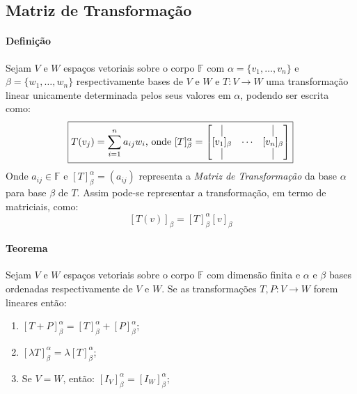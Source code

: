 \documentclass{article}
\begin{document}
        \subsection{Matriz de Transformação}
            \paragraph{Definição}Sejam $V$ e $W$ espaços vetoriais sobre o corpo $\mathbb{F}$ com $\alpha = \{v_{1},\dots,v_{n}\}$ e $\beta = \{w_{1},\dots,w_{n}\}$ respectivamente bases de $V$ e $W$ e $T: V \rightarrow W$ uma transformação linear unicamente determinada pelos seus valores em $\alpha$, podendo ser escrita como:
                \[\boxed{T(v_{j}) = \sum\limits_{i=1}^{n} a_{ij}w_{i} \text{, onde }
                [T]^{\alpha}_{\beta} = 
                \begin{bmatrix}
                    \vrule          &        & \vrule\\
                    [v_{1}]_{\beta} & \cdots & [v_{n}]_{\beta}\\
                    \vrule          &        & \vrule\\
                \end{bmatrix}}\]
            Onde $a_{ij} \in \mathbb{F}$ e $[T]^{\alpha}_{\beta} = (a_{ij})$ representa a \textit{Matriz de Transformação} da base $\alpha$ para base $\beta$ de $T$. Assim pode-se representar a transformação, em termo de matriciais, como:
                \[\boxed{[T(v)]_{\beta} = [T]_{\beta}^{\alpha}[v]_{\beta}}\]

            \paragraph{Teorema}Sejam $V$ e $W$ espaços vetoriais sobre o corpo $\mathbb{F}$ com dimensão finita e $\alpha$ e $\beta$ bases ordenadas respectivamente de $V$ e $W$. Se as transformações $T, P: V\rightarrow W$ forem lineares então:
                \begin{enumerate}[noitemsep]
                    \item $[T + P]_{\beta}^{\alpha} = [T]_{\beta}^{\alpha} + [P]_{\beta}^{\alpha}$;
                    \item $[\lambda T]_{\beta}^{\alpha} = \lambda [T]_{\beta}^{\alpha}$;
                    \item Se $V = W$, então: $[I_{V}]_{\beta}^{\alpha} = [I_{W}]_{\beta}^{\alpha}$;
                \end{enumerate}
\end{document}
